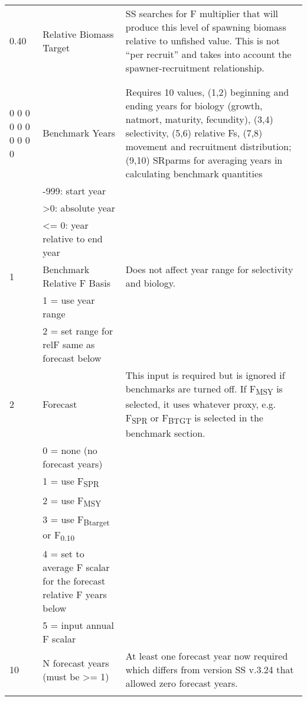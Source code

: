 \begin{landscape}
{\begin{longtable}{p{3.2cm} p{7cm} p{10.8cm}}
 \hline
 0.40 & Relative Biomass Target & \multirow{1}{1cm}[-0.25cm]{\parbox{11cm }{ SS searches for F multiplier that will produce this level of spawning biomass relative to unfished value.  This is not “per recruit” and takes into account the spawner-recruitment relationship.}} \Tstrut\\
      & & \Bstrut\\
      & & \Bstrut\\
  
 \hline
 0 0 0 0 0 0 0 0 0 0 & Benchmark Years & \multirow{1}{1cm}[-0.25cm]{\parbox{11cm }{ Requires 10 values, (1,2) beginning and ending years for biology (growth, natmort, maturity, fecundity), (3,4) selectivity, (5,6) relative Fs, (7,8) movement and recruitment distribution; (9,10) SRparms for averaging years in calculating benchmark quantities}} \Tstrut\\
  & -999: start year & \\
  & >0:   absolute year & \\
  & <= 0: year relative to end year & \\


  \pagebreak
  1 & Benchmark Relative F Basis &  \multirow{1}{1cm}[-0.25cm]{\parbox{11cm }{ Does not affect year range for selectivity and biology.}} \Tstrut\\
    & 1 = use year range & \\
    & 2 = set range for relF same as forecast below & \\
    
  \hline
  2 & Forecast & \multirow{1}{1cm}[-0.25cm]{\parbox{11cm }{ This input is required but is ignored if benchmarks are turned off.  If F\textsubscript{MSY} is selected, it uses whatever proxy, e.g. F\textsubscript{SPR} or F\textsubscript{BTGT} is selected in the benchmark section.}} \Tstrut\\
    & 0 = none (no forecast years) & \\
    & 1 = use F\textsubscript{SPR} & \\
    & 2 = use F\textsubscript{MSY} & \\
    & 3 = use F\textsubscript{Btarget} or F\textsubscript{0.10} & \\
    & 4 = set to average F scalar for the forecast relative F years below & \\
    & 5 = input annual F scalar & \Bstrut\\
    
  \hline
  10 & N forecast years (must be >= 1) &  \multirow{1}{1cm}[-0.25cm]{\parbox{11cm }{ At least one forecast year now required which differs from version SS v.3.24 that allowed zero forecast years.}} \Tstrut\\
     & & \Bstrut\\
     

\end{longtable}}
\end{landscape}
